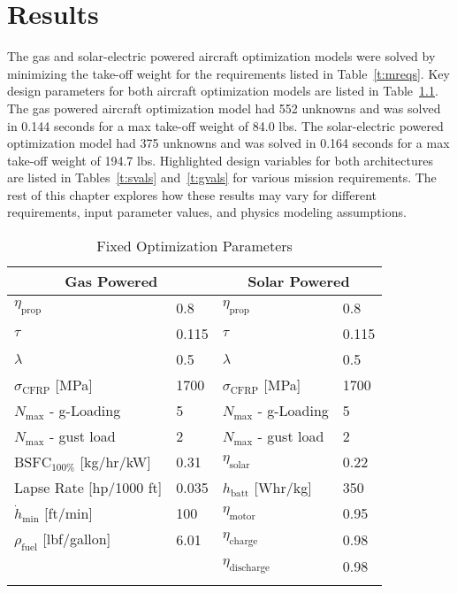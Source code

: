 
\chapter{Results}

The gas and solar-electric powered aircraft optimization models were solved by minimizing the take-off weight for the requirements listed in Table~\ref{t:mreqs}. 
Key design parameters for both aircraft optimization models are listed in Table~\ref{t:gassolarparams}.
The gas powered aircraft optimization model had 552 unknowns and was solved in 0.144 seconds for a max take-off weight of 84.0 lbs.  
The solar-electric powered optimization model had 375 unknowns and was solved in 0.164 seconds for a max take-off weight of 194.7 lbs.
Highlighted design variables for both architectures are listed in Tables~\ref{t:svals} and~\ref{t:gvals} for various mission requirements.
The rest of this chapter explores how these results may vary for different requirements, input parameter values, and physics modeling assumptions. 

\footnotesize
\begin{longtable}{llll}
\caption{Fixed Optimization Parameters} \\
\toprule
\toprule
\multicolumn{2}{c}{Gas Powered} & \multicolumn{2}{c}{Solar Powered}\\
\midrule
$\eta_{\text{prop}}$         & 0.8  & $\eta_{\text{prop}}$         & 0.8 \\
$\tau$                       & 0.115 & $\tau$                       & 0.115 \\
$\lambda$                    & 0.5  & $\lambda$                    & 0.5 \\
$\sigma_{\text{CFRP}}$ [MPa] & 1700 & $\sigma_{\text{CFRP}}$ [MPa] & 1700  \\
$N_{\text{max}}$ - g-Loading & 5    & $N_{\text{max}}$ - g-Loading & 5 \\
$N_{\text{max}}$ - gust load & 2    & $N_{\text{max}}$ - gust load & 2 \\
$\text{BSFC}_{100\%}$ [kg/hr/kW] & 0.31 & $\eta_{\text{solar}}$      & 0.22 \\
Lapse Rate [hp/1000 ft]      & 0.035 &  $h_{\text{batt}}$ [Whr/kg]   & 350 \\
$\dot{h}_{\text{min}}$ [ft/min] & 100 & $\eta_{\text{motor}}$           & 0.95 \\ 
$\rho_{\text{fuel}} $ [lbf/gallon] & 6.01 & $\eta_{\text{charge}}$          & 0.98 \\
                             &     & $\eta_{\text{discharge}}$       & 0.98 \\
\bottomrule
\label{t:gassolarparams}
 \end{longtable}

